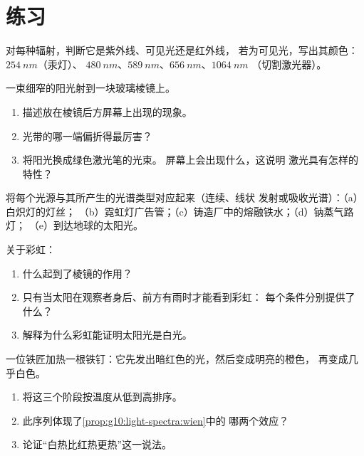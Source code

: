 \section{练习}

\begin{exercise}[$\star$]\label{exo:g10:light-spectra:1}
对每种辐射，判断它是紫外线、可见光还是红外线，
若为可见光，写出其颜色：$\qty{254}{nm}$（汞灯）、
$\qty{480}{nm}$、$\qty{589}{nm}$、$\qty{656}{nm}$、$\qty{1064}{nm}$
（切割激光器）。
\end{exercise}

\begin{exercise}[$\star$]\label{exo:g10:light-spectra:2}
一束细窄的阳光射到一块玻璃棱镜上。
\begin{enumerate}
  \item 描述放在棱镜后方屏幕上出现的现象。
  \item 光带的哪一端偏折得最厉害？
  \item 将阳光换成绿色激光笔的光束。
        屏幕上会出现什么，这说明
        激光具有怎样的特性？
\end{enumerate}
\end{exercise}

\begin{exercise}[$\star$]\label{exo:g10:light-spectra:3}
将每个光源与其所产生的光谱类型对应起来（连续、线状
发射或吸收光谱）：（a）白炽灯的灯丝；
（b）霓虹灯广告管；（c）铸造厂中的熔融铁水；（d）钠蒸气路灯；
（e）到达地球的太阳光。
\end{exercise}

\begin{exercise}[$\star$]\label{exo:g10:light-spectra:4}
关于彩虹：
\begin{enumerate}
  \item 什么起到了棱镜的作用？
  \item 只有当太阳在观察者身后、前方有雨时才能看到彩虹：
        每个条件分别提供了什么？
  \item 解释为什么彩虹能证明太阳光是白光。
\end{enumerate}
\end{exercise}

\begin{exercise}[$\star$]\label{exo:g10:light-spectra:5}
一位铁匠加热一根铁钉：它先发出暗红色的光，然后变成明亮的橙色，
再变成几乎白色。
\begin{enumerate}
  \item 将这三个阶段按温度从低到高排序。
  \item 此序列体现了\cref{prop:g10:light-spectra:wien}中的
        哪两个效应？
  \item 论证“白热比红热更热”这一说法。
\end{enumerate}
\end{exercise}

